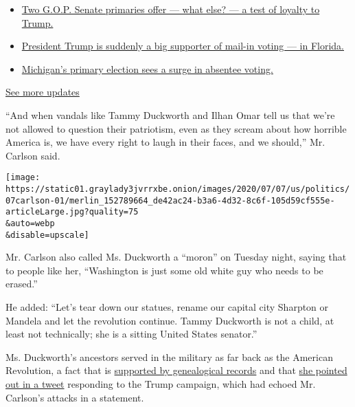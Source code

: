 \begin{itemize}
\tightlist
\item
  \href{https://www.nytimes3xbfgragh.onion/2020/08/04/us/elections/primary-election-michigan-arizona-kansas.html?action=click\&pgtype=Article\&state=default\&region=MAIN_CONTENT_1\&context=storylines_live_updates\#link-3924dd44}{Two
  G.O.P. Senate primaries offer --- what else? --- a test of loyalty to
  Trump.}
\item
  \href{https://www.nytimes3xbfgragh.onion/2020/08/04/us/elections/primary-election-michigan-arizona-kansas.html?action=click\&pgtype=Article\&state=default\&region=MAIN_CONTENT_1\&context=storylines_live_updates\#link-32b39e33}{President
  Trump is suddenly a big supporter of mail-in voting --- in Florida.}
\item
  \href{https://www.nytimes3xbfgragh.onion/2020/08/04/us/elections/primary-election-michigan-arizona-kansas.html?action=click\&pgtype=Article\&state=default\&region=MAIN_CONTENT_1\&context=storylines_live_updates\#link-ab1004d}{Michigan's
  primary election sees a surge in absentee voting.}
\end{itemize}

\href{https://www.nytimes3xbfgragh.onion/2020/08/04/us/elections/primary-election-michigan-arizona-kansas.html?action=click\&pgtype=Article\&state=default\&region=MAIN_CONTENT_1\&context=storylines_live_updates}{See
more updates}

``And when vandals like Tammy Duckworth and Ilhan Omar tell us that
we're not allowed to question their patriotism, even as they scream
about how horrible America is, we have every right to laugh in their
faces, and we should,'' Mr. Carlson said.

\texttt{[image: https://static01.graylady3jvrrxbe.onion/images/2020/07/07/us/politics/07carlson-01/merlin\_152789664\_de42ac24-b3a6-4d32-8c6f-105d59cf555e-articleLarge.jpg?quality=75\\\&auto=webp\\\&disable=upscale]}

Mr. Carlson also called Ms. Duckworth a ``moron'' on Tuesday night,
saying that to people like her, ``Washington is just some old white guy
who needs to be erased.''

He added: ``Let's tear down our statues, rename our capital city
Sharpton or Mandela and let the revolution continue. Tammy Duckworth is
not a child, at least not technically; she is a sitting United States
senator.''

Ms. Duckworth's ancestors served in the military as far back as the
American Revolution, a fact that is
\href{https://www.propublica.org/article/the-dig-tammy-duckworths-family-has-served-in-the-military-for-centuries}{supported
by genealogical records} and that
\href{https://twitter.com/TammyforIL/status/1280595475079598085}{she
pointed out in a tweet} responding to the Trump campaign, which had
echoed Mr. Carlson's attacks in a statement.


